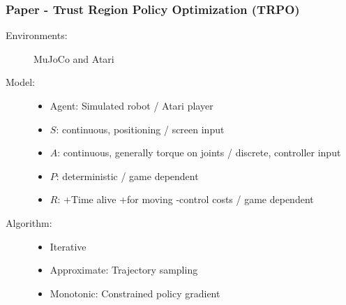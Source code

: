 \documentclass{beamer}
\begin{document}
\begin{frame} %
    \frametitle{Paper \thepapercounter - Trust Region Policy Optimization (TRPO)%
    }
    \begin{description}
        \item[Environments:] MuJoCo and Atari
        \item[Model:]
        \begin{itemize}
            \item Agent: Simulated robot / Atari player
            \item $S$: continuous, positioning / screen input
            \item $A$: continuous, generally torque on joints / discrete, controller input
            \item $P$: deterministic / game dependent
            \item $R$: +Time alive +for moving -control costs / game dependent
        \end{itemize}
        \item[Algorithm:]
        \begin{itemize}
            \item Iterative
            \item Approximate: Trajectory sampling
            \item Monotonic: Constrained policy gradient
        \end{itemize}
    \end{description}
\end{frame}
\end{document}
